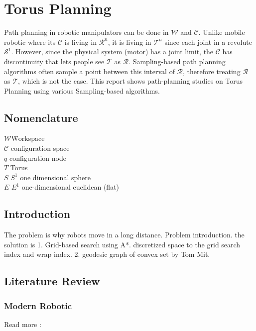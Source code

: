 \chapter{Torus Planning}

Path planning in robotic manipulators can be done in $\mathcal{W}$ and $\mathcal{C}$. Unlike mobile robotic where its $\mathcal{C}$ is living in $\mathcal{R}^n$, it is living in $\mathcal{T}^n$ since each joint in a revolute $\mathcal{S}^1$. However, since the physical system (motor) has a joint limit, the $\mathcal{C}$ has discontinuity that lets people see $\mathcal{T}$ as $\mathcal{R}$. Sampling-based path planning algorithms often sample a point between this interval of $\mathcal{R}$, therefore treating $\mathcal{R}$ as $\mathcal{T}$, which is not the case. This report shows path-planning studies on Torus Planning using various Sampling-based algorithms.


\section*{Nomenclature}
\begin{tabbing}
    $\mathcal{W}$\qquad \= Workspace\\
    $\mathcal{C}$ \> configuration space\\
    $q$ \>configuration node \\
    $T$ \>Torus \\
    $S$ \>$S^1$ one dimensional sphere \\
    $E$ \>$E^1$ one-dimensional euclidean (flat)
\end{tabbing}
\newcommand{\cs}{$\mathcal{C}$-space}



\section{Introduction}\label{intro}
The problem is why robots move in a long distance.
Problem introduction. the solution is 1. Grid-based search using A*. discretized space to the grid search index and wrap index. 2. geodesic graph of convex set by Tom Mit.


\section{Literature Review}


\subsection{Modern Robotic}
Read more : \cite{lynch2017}

